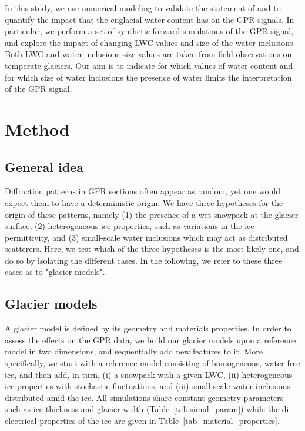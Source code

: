  In this study, we use numerical modeling to validate the statement of \cite{Smith&Evans1972} and to quantify the impact that the englacial water content has on the GPR signals. In particular, we perform a set of synthetic forward-simulations of the GPR signal, and explore the impact of changing LWC values and size of the water inclusions. Both LWC and water inclusions size values are taken from field observations on temperate glaciers. Our aim is to indicate for which values of water content and for which size of water inclusions the presence of water limits the interpretation of the  GPR signal.

 \section{Method}
\label{sec:method}

\subsection{General idea}

Diffraction patterns in GPR sections often appear as random, yet one would expect them to have a deterministic origin. We have three hypotheses for the origin of these patterns, namely (1) the presence of a wet snowpack at the glacier surface, (2) heterogeneous ice properties, such as variations in the ice permittivity, and (3) small-scale water inclusions which may act as distributed scatterers. Here, we test which of the three hypotheses is the most likely one, and do so by isolating the different cases. In the following, we refer to these three cases as to "glacier models".


\subsection{Glacier models}
\label{sec:glacier_materials}

A glacier model is defined by its geometry and materials properties. In order to assess the effects on the GPR data, we build our glacier models upon a reference model in two dimensions, and sequentially add new features to it. More specifically, we start with a reference model consisting of homogeneous, water-free ice, and then add, in turn, (i) a snowpack with a given LWC, (ii) heterogeneous ice properties with stochastic fluctuations, and (iii) small-scale water inclusions distributed amid the ice. All simulations share constant geometry parameters such as ice thickness and glacier width (Table~\ref{tab:simul_param}) while the di-electrical properties of the ice are given in Table~\ref{tab_material_properties}.


